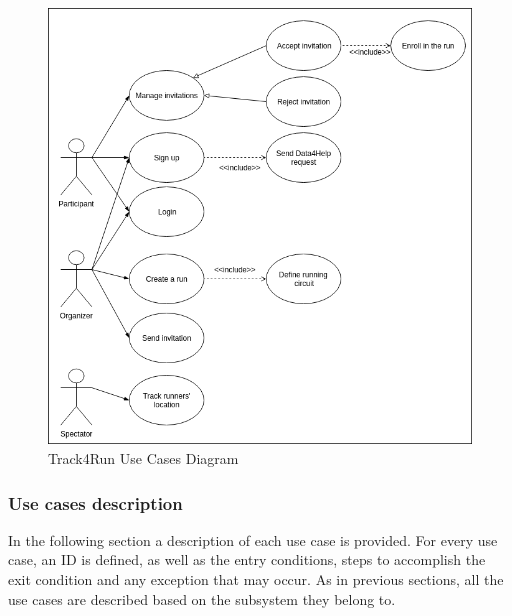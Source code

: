 \documentclass[12pt]{article}
\begin{document}
\begin{itemize}
\begin{figure}[H]
\centering
	\includegraphics[scale=0.6]{Diagrams/t4r_use_cases.png}
\caption[Track4Run Use Cases Diagram]{Track4Run Use Cases Diagram}
\label{fig:t4r_use_cases}
\end{figure}
\end{itemize}

\subsubsection{Use cases description}
In the following section a description of each use case is provided. For every use case, an ID is defined, as well as the entry conditions, steps to accomplish the exit condition and any exception that may occur. As in previous sections, all the use cases are described based on the subsystem they belong to.
\end{document}
